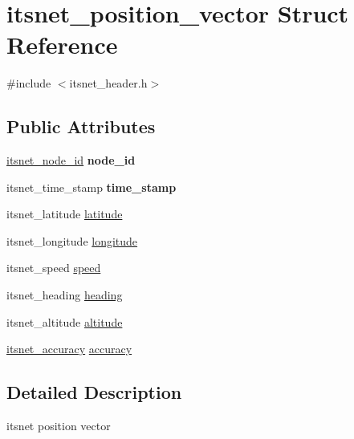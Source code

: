 \hypertarget{structitsnet__position__vector}{\section{itsnet\-\_\-position\-\_\-vector \-Struct \-Reference}
\label{structitsnet__position__vector}
}


{\ttfamily \#include $<$itsnet\-\_\-header.\-h$>$}

\subsection*{\-Public \-Attributes}
\begin{DoxyCompactItemize}
\item 
\hypertarget{structitsnet__position__vector_ae11fb546c2a46d47745f2d575a95cea6}{\hyperlink{structitsnet__node__id}{itsnet\-\_\-node\-\_\-id} {\bfseries node\-\_\-id}}\label{structitsnet__position__vector_ae11fb546c2a46d47745f2d575a95cea6}

\item 
\hypertarget{structitsnet__position__vector_ae0b0c85bee5080123f47d0ef7d67a45f}{itsnet\-\_\-time\-\_\-stamp {\bfseries time\-\_\-stamp}}\label{structitsnet__position__vector_ae0b0c85bee5080123f47d0ef7d67a45f}

\item 
itsnet\-\_\-latitude \hyperlink{structitsnet__position__vector_a1c0bd70cd8db169a923817257e495cc4}{latitude}
\item 
itsnet\-\_\-longitude \hyperlink{structitsnet__position__vector_aebcfbea2a0daa7f7457d75aae1d741f8}{longitude}
\item 
itsnet\-\_\-speed \hyperlink{structitsnet__position__vector_af373a8d179ae91c06fdfd765010233ab}{speed}
\item 
itsnet\-\_\-heading \hyperlink{structitsnet__position__vector_a896906d084fb63af3c0ca06c5e6f1bdc}{heading}
\item 
itsnet\-\_\-altitude \hyperlink{structitsnet__position__vector_a1fe86b14da3126d860a211b612d63753}{altitude}
\item 
\hyperlink{structitsnet__accuracy}{itsnet\-\_\-accuracy} \hyperlink{structitsnet__position__vector_a5bc5e07a112a28987fb7bf612648ff21}{accuracy}
\end{DoxyCompactItemize}


\subsection{\-Detailed \-Description}
itsnet position vector 

